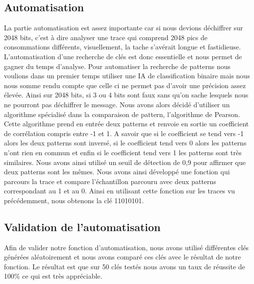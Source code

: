 \subsection{Automatisation}
La partie automatisation est assez importante car si nous devions déchiffrer sur 2048 bits, c'est à dire analyser une trace qui comprend 2048 pics de consommations différents, visuellement, la tache s'avérait longue et fastidieuse. L'automatisation d'une recherche de clés est donc essentielle et nous permet de gagner du temps d'analyse.
Pour automatiser la recherche de patterns nous voulions dans un premier temps utiliser une IA de classification binaire mais nous nous somme rendu compte que celle ci ne permet pas d'avoir une précision assez élevée. Ainsi sur 2048 bits, si 3 ou 4 bits sont faux sans qu'on sache lesquels nous ne pourront pas déchiffrer le message. Nous avons alors décidé d'utiliser un algorithme spécialisé dans la comparaison de pattern, l'algorithme de Pearson. Cette algorithme prend en entrée deux patterns et renvoie en sortie un coefficient de corrélation compris entre -1 et 1. A savoir que si le coefficient se tend vers -1 alors les deux patterns sont inversé, si le coefficient tend vers 0 alors les patterns n'ont rien en commun et enfin si le coefficient tend vers 1 les patterns sont très similaires. Nous avons ainsi utilisé un seuil de détection de 0,9 pour affirmer que deux patterns sont les mêmes. Nous avons ainsi développé une fonction qui parcours la trace et compare l'échantillon parcouru avec deux patterns correspondant au 1 et au 0.
Ainsi en utilisant cette fonction sur les traces vu précédemment, nous obtenons la clé 11010101.

\subsection{Validation de l'automatisation}
Afin de valider notre fonction d'automatisation, nous avons utilisé différentes clés générées aléatoirement et nous avons comparé ces clés avec le résultat de notre fonction. Le résultat est que sur 50 clés testés nous avons un taux de réussite de 100\% ce qui est très appréciable.